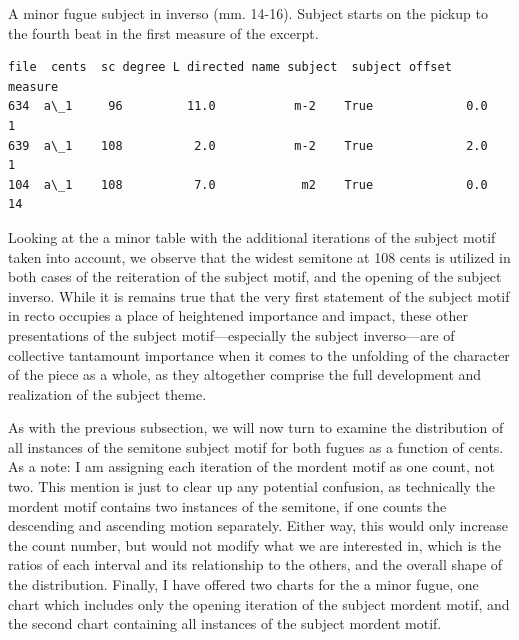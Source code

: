\begin{Example}[H]
    \begin{center}
    \caption[A minor fugue subject in inverso (mm. 14-16). ]{ A minor fugue subject in inverso (mm. 14-16). Subject starts on the pickup to the fourth beat in the first measure of the excerpt.}
    \end{center}
\end{Example}
    
\begin{Verbatim}[commandchars=\\\{\}]
    file  cents  sc degree L directed name subject  subject offset  measure
634  a\_1     96         11.0           m-2    True             0.0        1
639  a\_1    108          2.0           m-2    True             2.0        1
104  a\_1    108          7.0            m2    True             0.0       14
\end{Verbatim}
    Looking at the a minor table with the additional iterations of the
subject motif taken into account, we observe that the widest semitone at
108 cents is utilized in both cases of the reiteration of the subject
motif, and the opening of the subject inverso. While it is remains true
that the very first statement of the subject motif in recto occupies a
place of heightened importance and impact, these other presentations of
the subject motif---especially the subject inverso---are of
collective tantamount importance when it comes to the unfolding of the
character of the piece as a whole, as they altogether comprise the full
development and realization of the subject theme.

As with the previous subsection, we will now turn to examine the
distribution of all instances of the semitone subject motif for both
fugues as a function of cents. As a note: I am assigning each iteration
of the mordent motif as one count, not two. This mention is just to
clear up any potential confusion, as technically the mordent motif
contains two instances of the semitone, if one counts the descending and
ascending motion separately. Either way, this would only increase the
count number, but would not modify what we are interested in, which is
the ratios of each interval and its relationship to the others, and the
overall shape of the distribution. Finally, I have offered two charts
for the a minor fugue, one chart which includes only the opening
iteration of the subject mordent motif, and the second chart containing
all instances of the subject mordent motif.



